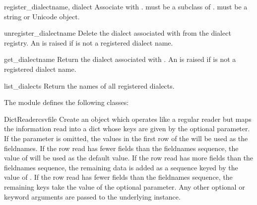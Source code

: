 \begin{funcdesc}{register_dialect}{name, dialect}
Associate  with .   must be a subclass
of .   must be a string or Unicode object.
\end{funcdesc}

\begin{funcdesc}{unregister_dialect}{name}
Delete the dialect associated with  from the dialect registry.  An
 is raised if  is not a registered dialect
name.
\end{funcdesc}

\begin{funcdesc}{get_dialect}{name}
Return the dialect associated with .  An  is
raised if  is not a registered dialect name.
\end{funcdesc}

\begin{funcdesc}{list_dialects}{}
Return the names of all registered dialects.
\end{funcdesc}


The  module defines the following classes:

\begin{classdesc}{DictReader}{csvfile}
Create an object which operates like a regular reader but maps the
information read into a dict whose keys are given by the optional
{} 
parameter.  If the  parameter is omitted, the values in
the first row of the  will be used as the fieldnames.
If the row read has fewer fields than the fieldnames sequence,
the value of  will be used as the default value.  If the row
read has more fields than the fieldnames sequence, the remaining data is
added as a sequence keyed by the value of .  If the row read
has fewer fields than the fieldnames sequence, the remaining keys take the
value of the optional  parameter.  Any other optional or
keyword arguments are passed to the underlying  instance.
\end{classdesc}


